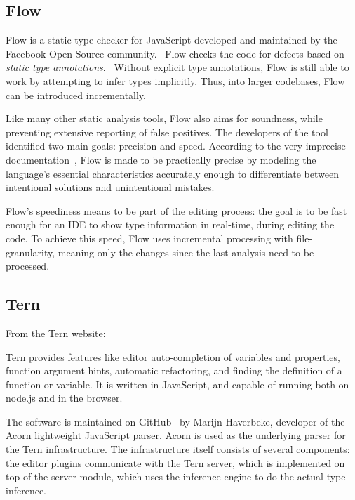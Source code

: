 \subsection{Flow}

Flow is a static type checker for JavaScript developed and maintained by the Facebook Open Source community.~\cite{flow-github} Flow checks the code for defects based on \emph{static type annotations}.~\cite{flow-website} Without explicit type annotations, Flow is still able to work by attempting to infer types implicitly. Thus, into larger codebases, Flow can be introduced incrementally.

Like many other static analysis tools, Flow also aims for soundness, while preventing extensive reporting of false positives. The developers of the tool identified two main goals: precision and speed. According to the very imprecise documentation~\cite{flow-docs}, Flow is made to be practically precise by modeling the language's essential characteristics accurately enough to differentiate between intentional solutions and unintentional mistakes.

Flow's speediness means to be part of the editing process: the goal is to be fast enough for an IDE to show type information in real-time, during editing the code. To achieve this speed, Flow uses incremental processing with file-granularity, meaning only the changes since the last analysis need to be processed.

\subsection{Tern}

From the Tern website: ~\cite{tern-website}

Tern provides features like editor auto-completion of variables and properties, function argument hints, automatic refactoring, and finding the definition of a function or variable. It is written in JavaScript, and capable of running both on node.js and in the browser.

The software is maintained on GitHub~\cite{tern-github} by Marijn Haverbeke, developer of the Acorn lightweight JavaScript parser. Acorn is used as the underlying parser for the Tern infrastructure. The infrastructure itself consists of several components: the editor plugins communicate with the Tern server, which is implemented on top of the server module, which uses the inference engine to do the actual type inference.~\cite{tern-website}

